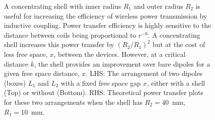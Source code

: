 \documentclass[11pt]{iopart}
\begin{document}
\begin{figure}
\begin{center}
\begin{minipage}{0.48\linewidth}
    \end{minipage}
  \end{center}
  \caption{A concentrating shell with inner radius $R_1$ and outer
    radius $R_2$ is useful for increasing the efficiency of wireless
    power transmission by inductive coupling. Power transfer efficiency is highly sensitive
    to the distance between coils being proportional to $r^{-6}$. A
    concentrating shell increases this power transfer by $(R_2/R_1)^2$
    but at the cost of less free space, $x$, between the
    devices. However, at a critical distance $k$, the shell provides
    an improvement over bare dipoles for a given free space distance,
    $x$. LHS: The arrangement of two dipoles (boxes) $L_1$ and $L_2$
    with a fixed free space gap $x$, either with a shell (Top) or
    without (Bottom). RHS: Theoretical power transfer plots for these
    two arrangements when the shell has $R_2 = 40$~mm, $R_1 =
    10$~mm.}\label{fig:d_motiv}
\end{figure}
\end{document}
